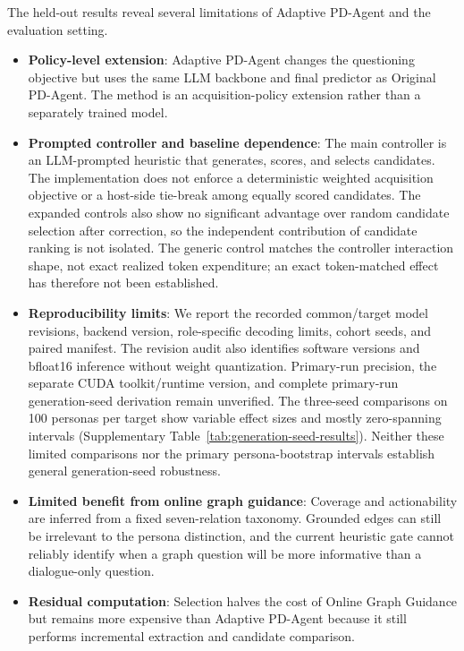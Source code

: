 \documentclass{ieeeaccess}
\begin{document}
The held-out results reveal several limitations of Adaptive PD-Agent and the evaluation
setting.

\begin{itemize}
    \item \textbf{Policy-level extension}: Adaptive PD-Agent changes the
    questioning objective but uses the same LLM backbone and final predictor as Original
    PD-Agent. The method is an acquisition-policy extension rather than a separately trained
    model.

    \item \textbf{Prompted controller and baseline dependence}: The main controller is an
    LLM-prompted heuristic that generates, scores, and selects candidates. The implementation
    does not enforce a deterministic weighted acquisition objective or a host-side tie-break
    among equally scored candidates. The expanded controls also show no
    significant advantage over random candidate selection after correction, so the independent
    contribution of candidate ranking is not isolated. The generic control matches the
    controller interaction shape, not exact realized token expenditure; an exact
    token-matched effect has therefore not been established.

    \item \textbf{Reproducibility limits}: We report the recorded common/target model
    revisions, backend version, role-specific decoding limits, cohort seeds, and paired
    manifest. The revision audit also identifies software versions and bfloat16 inference
    without weight quantization. Primary-run precision, the separate CUDA toolkit/runtime
    version, and complete primary-run generation-seed derivation remain unverified.
    The three-seed comparisons on 100 personas per target show variable effect sizes
    and mostly zero-spanning intervals (Supplementary
    Table~\ref{tab:generation-seed-results}). Neither these limited comparisons nor the
    primary persona-bootstrap intervals establish general generation-seed robustness.
    
    \item \textbf{Limited benefit from online graph guidance}: Coverage and actionability are inferred from a
    fixed seven-relation taxonomy. Grounded edges can still be irrelevant to the persona
    distinction, and the current heuristic gate cannot reliably identify when a graph
    question will be more informative than a dialogue-only question.
    
    \item \textbf{Residual computation}: Selection halves the cost of Online Graph Guidance
    but remains more expensive than Adaptive PD-Agent because it still performs
    incremental extraction and candidate comparison.


\end{itemize}
\end{document}
